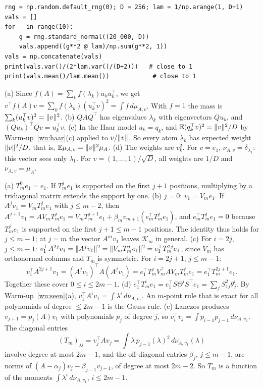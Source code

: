 \begin{verbatim}
rng = np.random.default_rng(0); D = 256; lam = 1/np.arange(1, D+1)
vals = []
for _ in range(10):
    g = rng.standard_normal((20_000, D))
    vals.append((g**2 @ lam)/np.sum(g**2, 1))
vals = np.concatenate(vals)
print(vals.var()/(2*lam.var()/(D+2)))   # close to 1
print(vals.mean()/lam.mean())            # close to 1
\end{verbatim}

(a) Since $f(A)=\sum_kf(\lambda_k)u_ku_k^\top$, we get $v^\top f(A)v=\sum_kf(\lambda_k)(u_k^\top v)^2=\int f\,d\mu_{A,v}$.
With $f=1$ the mass is $\sum_k(u_k^\top v)^2=\lVert v\rVert^2$.
\newline (b) $QAQ^\top$ has eigenvalues $\lambda_k$ with eigenvectors $Qu_k$, and $(Qu_k)^\top Qv=u_k^\top v$.
\newline (c) In the Haar model $u_k=q_k$, and $\mathbb{E}(q_k^\top v)^2=\lVert v\rVert^2/D$ by Warm-up~\ref{wu:haar}(c) applied to
$v/\lVert v\rVert$. So every atom $\lambda_k$ has expected weight $\lVert v\rVert^2/D$, that is, $\mathbb{E}\mu_{A,v}=\lVert v\rVert^2\mu_A$.
\newline (d) The weights are $v_k^2$. For $v=e_1$, $\nu_{A,v}=\delta_{\lambda_1}$: this vector sees only $\lambda_1$. For
$v=(1,\dots,1)/\sqrt D$, all weights are $1/D$ and $\nu_{A,v}=\mu_A$.

(a) $T_m^0e_1=e_1$. If $T_m^je_1$ is supported on the first $j+1$ positions, multiplying by a tridiagonal matrix
extends the support by one.
\newline (b) $j=0$: $v_1=V_me_1$. If $A^jv_1=V_mT_m^je_1$ with $j\le m-2$, then
$A^{j+1}v_1=AV_mT_m^je_1=V_mT_m^{j+1}e_1+\beta_mv_{m+1}(e_m^\top T_m^je_1)$, and $e_m^\top T_m^je_1=0$ because
$T_m^je_1$ is supported on the first $j+1\le m-1$ positions. The identity thus holds for $j\le m-1$; at $j=m$ the
vector $A^mv_1$ leaves $\mathcal{K}_m$ in general.
\newline (c) For $i=2j$, $j\le m-1$: $v_1^\top A^{2j}v_1=\lVert A^jv_1\rVert^2=\lVert V_mT_m^je_1\rVert^2=e_1^\top T_m^{2j}e_1$, since $V_m$
has orthonormal columns and $T_m$ is symmetric. For $i=2j+1$, $j\le m-1$:
\[v_1^\top A^{2j+1}v_1=(A^jv_1)^\top A(A^jv_1)=e_1^\top T_m^jV_m^\top AV_mT_m^je_1=e_1^\top T_m^{2j+1}e_1.\]
Together these cover $0\le i\le2m-1$.
\newline (d) $e_1^\top T_m^ie_1=e_1^\top S\Theta^iS^\top e_1=\sum_jS_{1j}^2\theta_j^i$. By Warm-up~\ref{wu:seen}(a),
$v_1^\top A^iv_1=\int\lambda^i\,d\nu_{A,v_1}$. An $m$-point rule that is exact for all polynomials of degree $\le2m-1$ is the Gauss
rule.
\newline (e) Lanczos produces $v_{j+1}=p_j(A)v_1$ with polynomials $p_j$ of degree $j$, so
$v_i^\top v_j=\int p_{i-1}p_{j-1}\,d\nu_{A,v_1}$. The diagonal entries
\[(T_m)_{jj}=v_j^\top Av_j=\int\lambda\,p_{j-1}(\lambda)^2\,d\nu_{A,v_1}(\lambda)\]
involve degree at most $2m-1$, and the off-diagonal entries $\beta_j$, $j\le m-1$, are norms of
$(A-\alpha_j)v_j-\beta_{j-1}v_{j-1}$, of degree at most $2m-2$. So $T_m$ is a function of the moments
$\int\lambda^i\,d\nu_{A,v_1}$, $i\le2m-1$.

